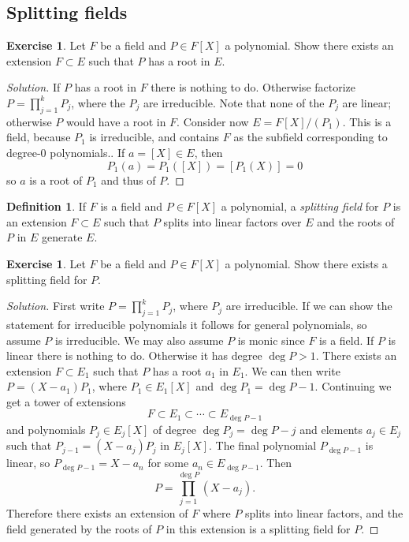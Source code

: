 \documentclass[11pt]{amsart}
\theoremstyle{definition}
\newtheorem{defi}[theo]{Definition}
\newtheorem{e}[theo]{Exercise}
\newenvironment{s}{\begin{proof}[Solution]}{\end{proof}}
\begin{document}
\subsection*{Splitting fields}

\begin{e}
Let $F$ be a field and $P \in F[X]$ a polynomial.
Show there exists an extension $F \subset E$ such that $P$ has a root in $E$.
\end{e}

\begin{s}
If $P$ has a root in $F$ there is nothing to do.
Otherwise factorize $P = \prod_{j=1}^k P_j$, where the $P_j$ are irreducible.
Note that none of the $P_j$ are linear; otherwise $P$ would have a root in $F$.
Consider now $E = F[X] / (P_1)$.
This is a field, because $P_1$ is irreducible, and contains $F$ as the subfield corresponding to degree-$0$ polynomials..
If $a = [X] \in E$, then
\[
P_1(a) 
= P_1([X])
= [P_1(X)]
= 0
\]
so $a$ is a root of $P_1$ and thus of $P$.
\end{s}


\begin{defi}
If $F$ is a field and $P \in F[X]$ a polynomial, a \emph{splitting field} for $P$ is an extension $F \subset E$ such that $P$ splits into linear factors over $E$ and the roots of $P$ in $E$ generate $E$.
\end{defi}





\begin{e}
Let $F$ be a field and $P \in F[X]$ a polynomial.
Show there exists a splitting field for $P$.
\end{e}

\begin{s}
First write $P = \prod_{j=1}^k P_j$, where $P_j$ are irreducible.
If we can show the statement for irreducible polynomials it follows for general polynomials, so assume $P$ is irreducible.
We may also assume $P$ is monic since $F$ is a field.
If $P$ is linear there is nothing to do.
Otherwise it has degree $\deg P > 1$.
There exists an extension $F \subset E_1$ such that $P$ has a root $a_1$ in $E_1$.
We can then write $P = (X - a_1) P_1$, where $P_1 \in E_1[X]$ and $\deg P_1 = \deg P - 1$.
Continuing we get a tower of extensions
\[
F \subset E_1 \subset \cdots \subset E_{\deg P - 1}
\]
and polynomials $P_j \in E_j[X]$ of degree $\deg P_j = \deg P - j$ and elements $a_j \in E_j$ such that $P_{j-1} = (X - a_j) P_j$ in $E_j[X]$.
The final polynomial $P_{\deg P - 1}$ is linear, so $P_{\deg P - 1} = X - a_n$ for some $a_n \in E_{\deg P - 1}$.
Then
\[
P = \prod_{j=1}^{\deg P} (X - a_j).
\]
Therefore there exists an extension of $F$ where $P$ splits into linear factors, and the field generated by the roots of $P$ in this extension is a splitting field for $P$.
\end{s}
\end{document}
